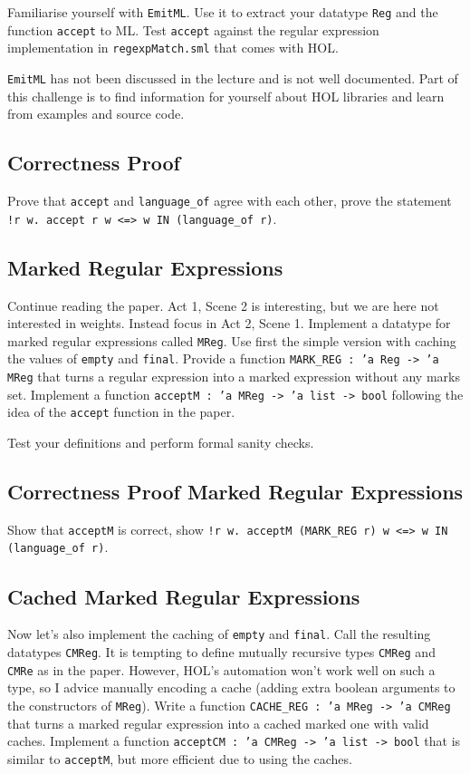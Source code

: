\documentclass[a4paper,10pt,oneside]{scrartcl}
\begin{document}
Familiarise yourself with \texttt{EmitML}. Use it to extract your datatype \texttt{Reg} and the function \texttt{accept} to ML. Test \texttt{accept} against the regular expression implementation in \texttt{regexpMatch.sml} that comes with HOL.

\texttt{EmitML} has not been discussed in the lecture and is not well documented. Part of this challenge is to find information for yourself about HOL libraries and learn from examples and source code.

\subsection{Correctness Proof}

Prove that \texttt{accept} and \texttt{language\_of} agree with each other, \ie prove the statement \texttt{!r w.\ accept r w <=> w IN (language\_of r)}.

\subsection{Marked Regular Expressions}

Continue reading the paper. Act 1, Scene 2 is interesting, but we are here not interested in weights. Instead focus in Act 2, Scene 1. Implement a datatype for marked regular expressions called \texttt{MReg}. Use first the simple version with caching the values of \texttt{empty} and \texttt{final}. Provide a function \texttt{MARK\_REG :\ 'a Reg -> 'a MReg} that turns a regular expression into a marked expression without any marks set. Implement a function \texttt{acceptM :\ 'a MReg -> 'a list -> bool} following the idea of the \texttt{accept} function in the paper.

Test your definitions and perform formal sanity checks.


\subsection{Correctness Proof Marked Regular Expressions}

Show that \texttt{acceptM} is correct, \ie show
\texttt{!r w.\ acceptM (MARK\_REG r) w <=> w IN (language\_of r)}.


\subsection{Cached Marked Regular Expressions}

Now let's also implement the caching of \texttt{empty} and \texttt{final}. Call the resulting datatypes \texttt{CMReg}. It is tempting to define mutually recursive types \texttt{CMReg} and \texttt{CMRe} as in the paper. However, HOL's automation won't work well on such a type, so I advice manually encoding a cache (\ie adding extra boolean arguments to the constructors of \texttt{MReg}). Write a function \texttt{CACHE\_REG :\ 'a MReg -> 'a CMReg} that turns a marked regular expression into a cached marked one with valid caches. Implement a function \texttt{acceptCM :\ 'a CMReg -> 'a list -> bool} that is similar to \texttt{acceptM}, but more efficient due to using the caches.
\end{document}
